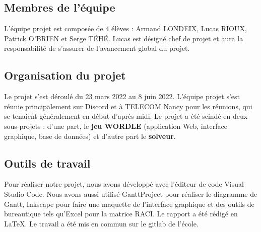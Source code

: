 \subsection{Membres de l'équipe}

\tabto{1cm}L'équipe projet est composée de 4 élèves : Armand LONDEIX, Lucas RIOUX, Patrick O'BRIEN et Serge TÉHÉ. Lucas est désigné chef de projet et aura la responsabilité de s'assurer de l'avancement global du projet.

\subsection{Organisation du projet}

\tabto{1cm}Le projet s'est déroulé du 23 mars 2022 au 8 juin 2022. L'équipe projet s'est réunie principalement sur Discord et à TELECOM Nancy pour les réunions, qui se tenaient généralement en début d'après-midi. Le projet a été scindé en deux sous-projets : d'une part, le \textbf{jeu WORDLE} (application Web, interface graphique, base de données) et d'autre part le \textbf{solveur}.

\subsection{Outils de travail}

\tabto{1cm}Pour réaliser notre projet, nous avons développé avec l'éditeur de code Visual Studio Code. Nous avons aussi utilisé GanttProject pour réaliser le diagramme de Gantt, Inkscape pour faire une maquette de l'interface graphique et des outils de bureautique tels qu'Excel pour la matrice RACI. Le rapport a été rédigé en \LaTeX{}. Le travail a été mis en commun sur le gitlab de l'école.




